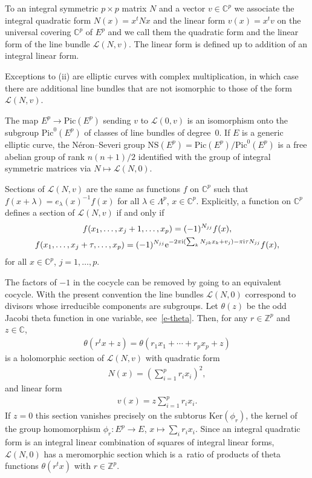 \documentclass[pdftex]{sigma}
\numberwithin{equation}{section}
\begin{document}
To an integral symmetric $p\times p$ matrix $N$ and a vector $v\in \mathbb C^p$ we associate the integral quadratic form $N(x)=x^tNx$ and the linear form $v(x)=x^tv$ on the universal covering $\mathbb C^p$ of $E^p$ and we call them the quadratic form and the linear form of the line bundle $\mathcal L(N,v)$. The linear form is defined up to addition of an integral linear form.

\begin{Remark} Exceptions to (ii) are elliptic curves with complex multiplication, in which case there are additional line bundles that are not isomorphic to those of the form $\mathcal L(N,v)$.
\end{Remark}
\begin{Remark} The map $E^p\to \mathrm{Pic}(E^p)$ sending $v$ to $\mathcal L(0,v)$ is an isomorphism onto the subgroup $\mathrm{Pic}^0(E^p)$ of classes of line bundles of degree~0. If $E$ is a generic elliptic curve, the N\'eron--Severi group $\mathrm{NS}(E^p)=\mathrm{Pic}(E^p)/\mathrm{Pic}^0(E^p)$ is a free abelian group of rank $n(n+1)/2$ identified with the group of integral symmetric matrices via $N\mapsto \mathcal L(N,0)$.
\end{Remark}
\begin{Remark} \label{rem5.4} Sections of $\mathcal L(N,v)$ are the same as functions $f$ on $\mathbb C^p$ such that $f(x+\lambda)=e_\lambda(x)^{-1}f(x)$ for all $\lambda\in\Lambda^p$, $x\in\mathbb C^p$. Explicitly, a function on $\mathbb C^p$ defines a section of $\mathcal L(N,v)$ if and only if
 \begin{gather*} f(x_1,\dots,x_j+1,\dots,x_p) = (-1)^{N_{jj}}f(x), \\
 f(x_1,\dots,x_j+\tau,\dots,x_p) = (-1)^{N_{jj}}{\rm e}^{-2\pi{\rm i}(\sum_k N_{jk}x_k+v_j)-\pi {\rm i} \tau N_{jj}} f(x),
 \end{gather*} for all $x\in\mathbb C^p$, $j=1,\dots,p$.
\end{Remark}
\begin{Remark} The factors of $-1$ in the cocycle can be removed by going to an equivalent cocycle. With the present convention the line bundles $\mathcal L(N,0)$ correspond to divisors whose irreducible components are subgroups. Let $\theta(z)$ be the odd Jacobi theta function in one variable, see~\eqref{e-theta}. Then, for any $r\in\mathbb Z^p$ and $z\in\mathbb C$,
 \begin{gather*}
 \theta(r^tx+z)=\theta(r_1x_1+\cdots+r_px_p+z)
 \end{gather*}
 is a holomorphic section of $\mathcal L(N,v)$ with quadratic form
 \begin{gather*}
 N(x)=\left(\sum_{i=1}^pr_ix_i\right)^2,
 \end{gather*}
 and linear form
 \begin{gather*}
 v(x)=z\sum_{i=1}^p r_ix_i.
 \end{gather*}
If $z=0$ this section vanishes precisely on the subtorus $\mathrm{Ker}(\phi_r)$, the kernel of the group homomorphism $\phi_r\colon E^p\to E$, $x\mapsto \sum_ir_ix_i$. Since an integral quadratic form is an integral linear combination of squares of integral linear forms, $\mathcal L(N,0)$ has a meromorphic section which is a~ratio of products of theta functions $\theta(r^tx)$ with $r\in\mathbb Z^p$.
\end{Remark}
\end{document}
